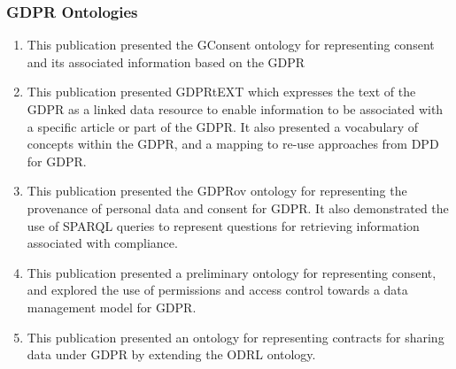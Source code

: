 \subsubsection{GDPR Ontologies}
\begin{enumerate}[start]
    \item \textbf{}
        \newline
        This publication presented the GConsent ontology for representing consent and its associated information based on the GDPR
    \item \textbf{}
        \newline
        This publication presented GDPRtEXT which expresses the text of the GDPR as a linked data resource to enable information to be associated with a specific article or part of the GDPR. It also presented a vocabulary of concepts within the GDPR, and a mapping to re-use approaches from DPD for GDPR.
    \item \textbf{}
        \newline
        This publication presented the GDPRov ontology for representing the provenance of personal data and consent for GDPR. It also demonstrated the use of SPARQL queries to represent questions for retrieving information associated with compliance.
    \item \textbf{}
        \newline
        This publication presented a preliminary ontology for representing consent, and explored the use of permissions and access control towards a data management model for GDPR.
    \item \textbf{}
        \newline
        This publication presented an ontology for representing contracts for sharing data under GDPR by extending the ODRL ontology.
\end{enumerate}

